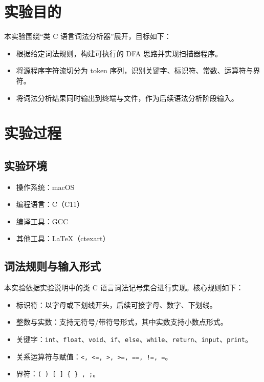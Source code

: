 \documentclass[12pt,a4paper]{ctexart}
\title{\reporttitle}
\author{\authname：\underline{\hspace{3cm}} \quad \authid：\underline{\hspace{3cm}}}
\date{\today}
\begin{document}
\maketitle

\section{实验目的}
本实验围绕“类 C 语言词法分析器”展开，目标如下：
\begin{itemize}
	\item 根据给定词法规则，构建可执行的 DFA 思路并实现扫描器程序。
	\item 将源程序字符流切分为 token 序列，识别关键字、标识符、常数、运算符与界符。
	\item 将词法分析结果同时输出到终端与文件，作为后续语法分析阶段输入。
\end{itemize}

\section{实验过程}
\subsection{实验环境}
\begin{itemize}
	\item 操作系统：macOS
	\item 编程语言：C（C11）
	\item 编译工具：GCC
	\item 其他工具：LaTeX（ctexart）
\end{itemize}

\subsection{词法规则与输入形式}
本实验依据实验说明中的类 C 语言词法记号集合进行实现。核心规则如下：
\begin{itemize}
	\item 标识符：以字母或下划线开头，后续可接字母、数字、下划线。
	\item 整数与实数：支持无符号/带符号形式，其中实数支持小数点形式。
	\item 关键字：\texttt{int}、\texttt{float}、\texttt{void}、\texttt{if}、\texttt{else}、\texttt{while}、\texttt{return}、\texttt{input}、\texttt{print}。
	\item 关系运算符与赋值：\texttt{<, <=, >, >=, ==, !=, =}。
	\item 界符：\texttt{( ) [ ] \{ \} , ;}。
\end{itemize}
\end{document}
